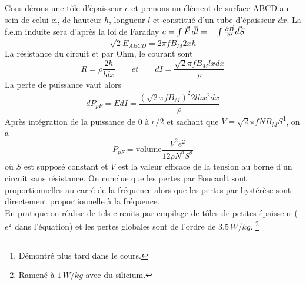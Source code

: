 	Considérons une tôle d'épaisseur $e$ et prenons un élément de surface ABCD au sein de celui-ci, de hauteur $h$, longueur $l$ et constitué d'un tube d'épaisseur $dx$. La f.e.m induite sera d'après la loi de Faraday $e = \int \vec{E}\, \vec{dl} = -\int \frac{\D \vec{B}}{\D  t} \vec{dS}$
	\begin{equation}
		\sqrt{2} E_{ABCD} = 2\pi f B_M 2xh
	\end{equation}	 
	La résistance du circuit et par Ohm, le courant sont 
	\begin{equation}
		R = \rho\frac{2h}{ldx} \qquad et \qquad dI = \frac{\sqrt{2}\pi f B_M lxdx}{\rho}
	\end{equation}
	La perte de puissance vaut alors
	\begin{equation}
		dP_{pF} = EdI = \frac{(\sqrt{2}\pi f B_M)^2  2lhx^2dx}{\rho}
	\end{equation}
	Après intégration de la puissance de 0 à $e/2$	et sachant que $V = \sqrt{2}\pi f NB_MS$\footnote{Démontré plus tard dans le cours.}, on a 
	\begin{equation}
		P_{pF} = \mbox{volume}\frac{V^2e^2}{12\rho N^2 S^2}
	\end{equation}
	où $S$ est supposé constant et $V$ est la valeur efficace de la tension au borne d'un circuit sans résistance. On conclue que les pertes par Foucault sont proportionnelles au carré de la fréquence alors que les pertes par hystérèse sont directement proportionnelle à la fréquence. \\
	En pratique on réalise de tels circuits par empilage de tôles de petites épaisseur ($e^2$ dans l'équation) et les pertes globales sont de l'ordre de $3.5\, W/kg$. \footnote{Ramené à $1\, W/kg$ avec du silicium.}
	
